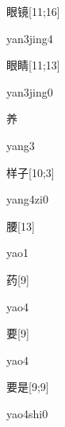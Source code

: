 \begin{verbete}{眼镜}[11;16]
\begin{pronuncia}{yan3jing4}
\end{pronuncia}
\end{verbete}

\begin{verbete}{眼睛}[11;13]
\begin{pronuncia}{yan3jing0}
\end{pronuncia}
\end{verbete}

\begin{verbete}[yang3]{养}
\begin{pronuncia}{yang3}
\end{pronuncia}
\end{verbete}

\begin{verbete}[yang4zi0]{样子}[10;3]
\begin{pronuncia}{yang4zi0}
\end{pronuncia}
\end{verbete}

\begin{verbete}[yao1]{腰}[13]
\begin{pronuncia}{yao1}
\end{pronuncia}
\end{verbete}

\begin{verbete}[yao4]{药}[9]
\begin{pronuncia}{yao4}
\end{pronuncia}
\end{verbete}

\begin{verbete}[yao4]{要}[9]
\begin{pronuncia}{yao4}
\end{pronuncia}
\end{verbete}

\begin{verbete}{要是}[9;9]
\begin{pronuncia}{yao4shi0}
\end{pronuncia}
\end{verbete}

